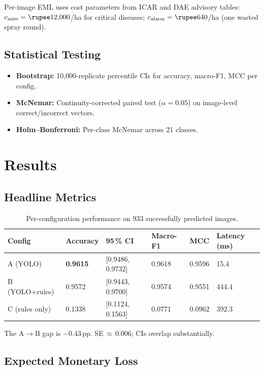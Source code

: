 \documentclass[runningheads]{llncs}
\begin{document}
Per-image EML uses cost parameters from ICAR and DAE advisory tables:
$c_{\text{miss}}=\text{\rupee}12{,}000$/ha for critical diseases;
$c_{\text{alarm}}=\text{\rupee}640$/ha (one wasted spray round).

\subsection{Statistical Testing}
\begin{itemize}
  \item \textbf{Bootstrap:} 10{,}000-replicate percentile CIs for accuracy,
        macro-F1, MCC per config.
  \item \textbf{McNemar:} Continuity-corrected paired test ($\alpha=0.05$)
        on image-level correct/incorrect vectors.
  \item \textbf{Holm--Bonferroni:} Per-class McNemar across 21 classes.
\end{itemize}

\section{Results}

\subsection{Headline Metrics}

\begin{table}[h]
\centering
\caption{Per-configuration performance on 933 successfully predicted images.}
\label{tab:headline}
\begin{tabular}{@{}llllll@{}}
\toprule
Config & Accuracy & 95\,\% CI & Macro-F1 & MCC & Latency (ms) \\
\midrule
A (YOLO)       & \textbf{0.9615} & [0.9486, 0.9732] & 0.9618 & 0.9596 & 15.4  \\
B (YOLO+rules) & 0.9572          & [0.9443, 0.9700] & 0.9574 & 0.9551 & 444.4 \\
C (rules only) & 0.1338          & [0.1124, 0.1563] & 0.0771 & 0.0962 & 392.3 \\
\bottomrule
\end{tabular}
\end{table}

\noindent The A$\to$B gap is $-$0.43\,pp. SE\,$\approx$\,0.006; CIs overlap substantially.

\subsection{Expected Monetary Loss}
\end{document}
